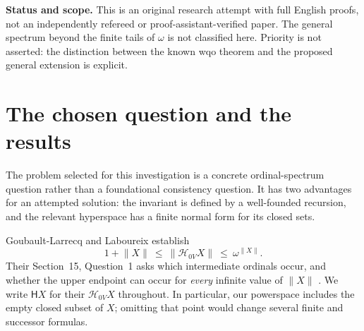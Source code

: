 \documentclass[11pt,a4paper]{article}
\theoremstyle{definition}
\newcommand{\HH}{\mathsf H}
\newcommand{\st}[1]{\lVert #1\rVert}
\numberwithin{equation}{section}
\begin{document}
\begin{titlepage}
\begin{minipage}{0.91\textwidth}
\begin{abstract}
We also determine the entire spectrum at each stature $\omega+n$,
$n<\omega$.  Its elements are precisely
$\omega\,j(U)+j(Q)-j(U)$, where $Q$ ranges over $n$-element posets,
$U$ ranges over their downsets, and $j(P)$ counts the downsets of $P$.
The proof isolates a canonical infinite closed core, removes a possible
generic point without changing the closed lattice, and computes a
finite-cell rank.  Every permitted value is realized by an explicit
countable space.  An accompanying program enumerates the finite spectra
through $n=6$ and checks a separate finite-model identity.
\end{abstract}
\end{minipage}
\vfill
\begin{minipage}{0.91\textwidth}
\small\color{WarmGray}
\textbf{Status and scope.} This is an original research attempt with full
English proofs, not an independently refereed or proof-assistant-verified
paper.  The general spectrum beyond the finite tails of $\omega$ is not
classified here.  Priority is not asserted: the distinction between the
known wqo theorem and the proposed general extension is explicit.
\end{minipage}
\end{titlepage}
\hypersetup{pageanchor=true}

\tableofcontents
\clearpage
{}

\section{The chosen question and the results}
\label{sec:intro}

The problem selected for this investigation is a concrete ordinal-spectrum
question rather than a foundational consistency question.  It has two
advantages for an attempted solution: the invariant is defined by a
well-founded recursion, and the relevant hyperspace has a finite normal
form for its closed sets.

Goubault-Larrecq and Laboureix establish
\begin{equation}\label{eq:old}
  1+\st X\ \leq\ \st{\mathcal H_{0V}X}\ \leq\ \omega^{\st X}.
\end{equation}
Their Section~15, Question~1 asks which intermediate ordinals occur, and
whether the upper endpoint can occur for \emph{every} infinite value of
$\st X$ \cite[Section~15, Question~1]{GL23}.  We write $\HH X$ for their
$\mathcal H_{0V}X$ throughout.  In particular, our powerspace includes the
empty closed subset of $X$; omitting that point would change several finite
and successor formulas.
\end{document}
